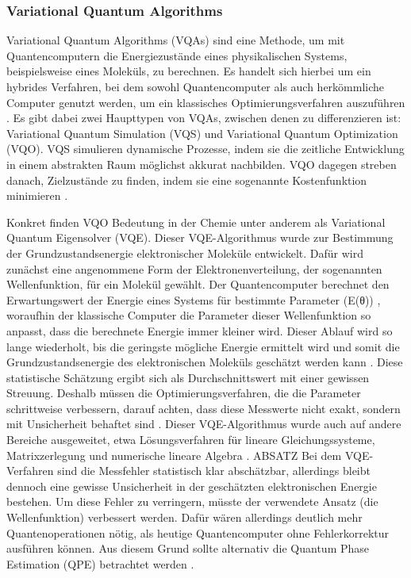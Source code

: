 \subsubsection*{Variational Quantum Algorithms}
{Variational Quantum Algorithms (VQAs) sind eine Methode, um mit Quantencomputern die Energiezustände eines physikalischen Systems, beispielsweise eines Moleküls, zu berechnen. Es handelt sich hierbei um ein hybrides Verfahren, bei dem sowohl Quantencomputer als auch herkömmliche Computer genutzt werden, um ein klassisches Optimierungsverfahren auszuführen \citealp[6]{weidmanQuantumComputingChemistry2024a}.
Es gibt dabei zwei Haupttypen von VQAs, zwischen denen zu differenzieren ist: Variational Quantum Simulation (VQS) und Variational Quantum Optimization (VQO). VQS simulieren dynamische Prozesse, indem sie die zeitliche Entwicklung in einem abstrakten Raum möglichst akkurat nachbilden. VQO dagegen streben danach, Zielzustände zu finden, indem sie eine sogenannte Kostenfunktion minimieren \citealp[23]{mottaEmergingQuantumComputing2022}.

Konkret finden VQO Bedeutung in der Chemie unter anderem als Variational Quantum Eigensolver (VQE). Dieser VQE-Algorithmus wurde zur Bestimmung der Grundzustandsenergie elektronischer Moleküle entwickelt. Dafür wird zunächst eine angenommene Form der Elektronenverteilung, der sogenannten Wellenfunktion, für ein Molekül gewählt. Der Quantencomputer berechnet den Erwartungswert der Energie eines Systems für bestimmte Parameter (E(θ)) \citealp[23]{mottaEmergingQuantumComputing2022}, woraufhin der klassische Computer die Parameter dieser Wellenfunktion so anpasst, dass die berechnete Energie immer kleiner wird. Dieser Ablauf wird so lange wiederholt, bis die geringste mögliche Energie ermittelt wird und somit die Grundzustandsenergie des elektronischen Moleküls geschätzt werden kann \citealp[6]{weidmanQuantumComputingChemistry2024a}.
Diese statistische Schätzung ergibt sich als Durchschnittswert mit einer gewissen Streuung. Deshalb müssen die Optimierungsverfahren, die die Parameter schrittweise verbessern, darauf achten, dass diese Messwerte nicht exakt, sondern mit Unsicherheit behaftet sind \citealp[23]{mottaEmergingQuantumComputing2022}.
Dieser VQE-Algorithmus wurde auch auf andere Bereiche ausgeweitet, etwa Lösungsverfahren für lineare Gleichungssysteme, Matrixzerlegung und numerische lineare Algebra \citealp[6]{weidmanQuantumComputingChemistry2024a}.
ABSATZ
Bei dem VQE-Verfahren sind die Messfehler statistisch klar abschätzbar, allerdings bleibt dennoch eine gewisse Unsicherheit in der geschätzten elektronischen Energie bestehen. Um diese Fehler zu verringern, müsste der verwendete Ansatz (die Wellenfunktion) verbessert werden. Dafür wären allerdings deutlich mehr Quantenoperationen nötig, als heutige Quantencomputer ohne Fehlerkorrektur ausführen können. Aus diesem Grund sollte alternativ die Quantum Phase Estimation (QPE) betrachtet werden \citealp[7]{vonburgQuantumComputingEnhanced2021}.}



